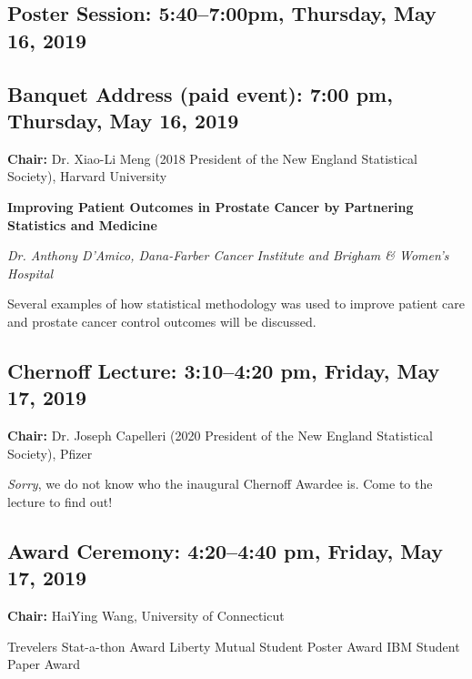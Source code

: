 \documentclass[10pt]{article}
\begin{document}
\subsection*{Poster Session: \hfill 5:40--7:00pm, Thursday, May 16,  2019}

\subsection*{Banquet Address (paid event):  \hfill 7:00 pm, Thursday, May 16, 2019}

{\bf Chair:}
Dr. Xiao-Li Meng (2018 President of the New England
Statistical Society), Harvard University

\noindent
{\bf Improving Patient Outcomes in Prostate Cancer by Partnering
  Statistics and Medicine}

\emph{Dr. Anthony D'Amico, Dana-Farber Cancer Institute and Brigham \& Women's Hospital}

Several examples of how statistical methodology was used to improve
patient care and prostate cancer control outcomes will be discussed.


\subsection*{Chernoff Lecture: \hfill 3:10--4:20 pm, Friday, May 17, 2019}
{\bf Chair:}
Dr. Joseph Capelleri (2020 President of the New England
Statistical Society),  Pfizer

\emph{Sorry}, we do not know who the inaugural Chernoff Awardee is. Come to the
lecture to find out!

\subsection*{Award Ceremony: \hfill 4:20--4:40 pm, Friday, May 17, 2019}

{\bf Chair:} HaiYing Wang, University of Connecticut

Trevelers Stat-a-thon Award\hfill
Liberty Mutual Student Poster Award \hfill
IBM Student Paper Award
\end{document}
